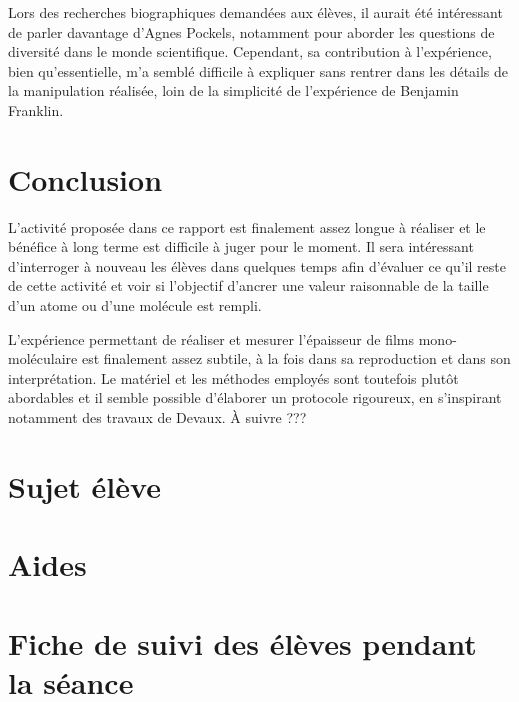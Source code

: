 \documentclass[12pt,a4paper]{article}
\begin{document}
Lors des recherches biographiques demandées aux élèves, il aurait été intéressant de parler davantage d'Agnes Pockels, notamment pour aborder les questions de diversité dans le monde scientifique.
Cependant, sa contribution à l'expérience, bien qu'essentielle, m'a semblé difficile à expliquer sans rentrer dans les détails de la manipulation réalisée, loin de la simplicité de l'expérience de Benjamin Franklin.

\section*{Conclusion}

L'activité proposée dans ce rapport est finalement assez longue à réaliser et le bénéfice à long terme est difficile à juger pour le moment.
Il sera intéressant d'interroger à nouveau les élèves dans quelques temps afin d'évaluer ce qu'il reste de cette activité et voir si l'objectif d'ancrer une valeur raisonnable de la taille d'un atome ou d'une molécule est rempli.

L'expérience permettant de réaliser et mesurer l'épaisseur de films mono-moléculaire est finalement assez subtile, à la fois dans sa reproduction et dans son interprétation.
Le matériel et les méthodes employés sont toutefois plutôt abordables et il semble possible d'élaborer un protocole rigoureux, en s'inspirant notamment des travaux de Devaux.
À suivre ???

\newpage
\appendix



\newpage
\appendix



\section{Sujet élève}
\label{ann:sujet}



\section{Aides}
\label{ann:aides}



\section{Fiche de suivi des élèves pendant la séance}


\end{document}
